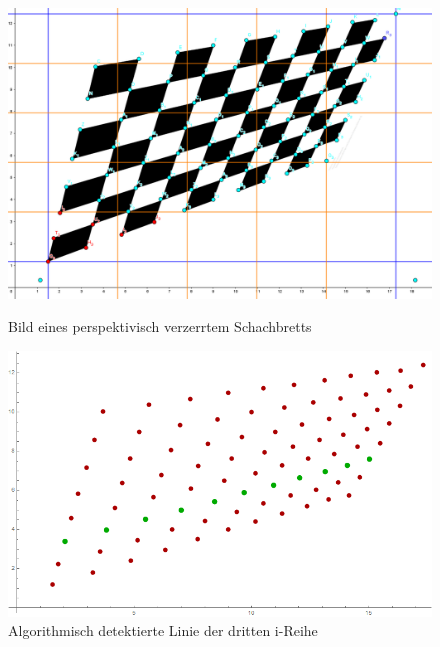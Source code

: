 %

\begin{figure}[!htb]
	\includegraphics[width=\linewidth]{images/perspektivisch.png}
	\caption{Bild eines perspektivisch verzerrtem Schachbretts}
	\label{fig:awesome_image1}
	\endminipage\hfill
	\includegraphics[width=\linewidth]{images/AlgPerspektifisch.png}
	\caption{Algorithmisch detektierte Linie der dritten i-Reihe}
	\label{fig:awesome_image2}
	\endminipage\hfill
\end{figure}

